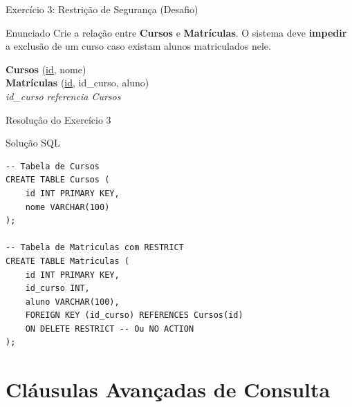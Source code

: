 \documentclass[9pt]{beamer}
\begin{document}
\begin{frame}{Exercício 3: Restrição de Segurança (Desafio)}
  \begin{block}{Enunciado}
    Crie a relação entre \textbf{Cursos} e \textbf{Matrículas}. O sistema deve \textbf{impedir} a exclusão de um curso caso existam alunos matriculados nele.
  \end{block}
  \vspace{0.4cm}
  \centering

  \vspace{0.3cm}
  \centering
  \small
  \textbf{Cursos} (\underline{id}, nome) \\
  \textbf{Matrículas} (\underline{id}, id\_curso, aluno) \\
  \textit{id\_curso referencia Cursos}
\end{frame}

\begin{frame}[fragile]{Resolução do Exercício 3}
  \begin{exampleblock}{Solução SQL}
\begin{lstlisting}
-- Tabela de Cursos
CREATE TABLE Cursos (
    id INT PRIMARY KEY,
    nome VARCHAR(100)
);

-- Tabela de Matriculas com RESTRICT
CREATE TABLE Matriculas (
    id INT PRIMARY KEY,
    id_curso INT,
    aluno VARCHAR(100),
    FOREIGN KEY (id_curso) REFERENCES Cursos(id)
    ON DELETE RESTRICT -- Ou NO ACTION
);
\end{lstlisting}
  \end{exampleblock}
\end{frame}

\section{Cláusulas Avançadas de Consulta}
\end{document}

